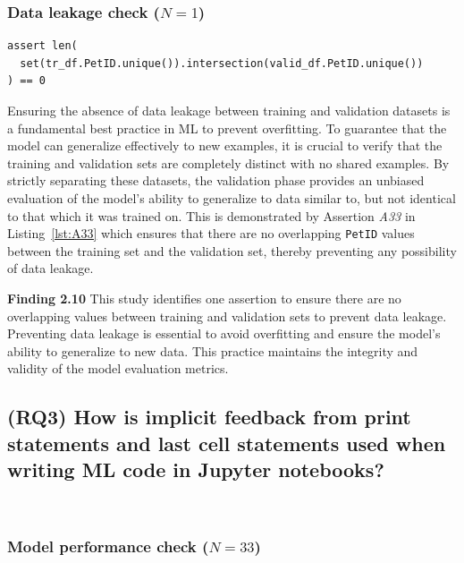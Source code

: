 \documentclass[smallextended]{svjour3}       %
\newcommand{\highlight}[1]{\begin{framed}%
  \noindent#1
\end{framed}}
\begin{document}
\subsubsection{Data leakage check ($N = 1$)}

\begin{lstlisting}[caption={Assertion \emph{A33} used to ensure that the training and validation sets do not contain any overlapping values.}, label={lst:A33}]
assert len(
  set(tr_df.PetID.unique()).intersection(valid_df.PetID.unique())
) == 0
\end{lstlisting}

Ensuring the absence of data leakage between training and validation datasets is a fundamental best practice in ML to prevent overfitting. To guarantee that the model can generalize effectively to new examples, it is crucial to verify that the training and validation sets are completely distinct with no shared examples. By strictly separating these datasets, the validation phase provides an unbiased evaluation of the model's ability to generalize to data similar to, but not identical to that which it was trained on. This is demonstrated by Assertion \emph{A33} in Listing~\ref{lst:A33} which ensures that there are no overlapping \lstinline{PetID} values between the training set and the validation set, thereby preventing any possibility of data leakage.

\highlight{\textbf{Finding 2.10} This study identifies one assertion to ensure there are no overlapping values between training and validation sets to prevent data leakage. Preventing data leakage is essential to avoid overfitting and ensure the model's ability to generalize to new data. This practice maintains the integrity and validity of the model evaluation metrics.}

\subsection{(RQ3) How is implicit feedback from print statements and last cell statements used when writing ML code in Jupyter notebooks?}~\label{sec:result-implicit}

\subsubsection{Model performance check ($N = 33$)}
\end{document}
